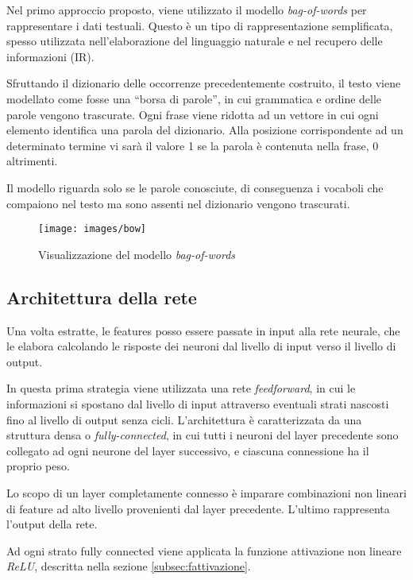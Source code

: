Nel primo approccio proposto, viene utilizzato il modello \emph{bag-of-words} per rappresentare i dati testuali.
Questo è un tipo di rappresentazione semplificata, spesso utilizzata nell'elaborazione del linguaggio naturale e nel recupero delle informazioni (IR). 

Sfruttando il dizionario delle occorrenze precedentemente costruito, il testo viene modellato  come fosse una ``borsa di parole'', in cui grammatica e ordine delle parole vengono trascurate.
Ogni frase viene ridotta ad un vettore in cui ogni elemento identifica una parola del dizionario. Alla posizione corrispondente ad un determinato termine vi sarà il valore \num{1} se la parola è contenuta nella frase, \num{0} altrimenti.

Il modello riguarda solo se le parole conosciute, di conseguenza i vocaboli che compaiono nel testo ma sono assenti nel dizionario vengono trascurati.

\begin{figure}[H]
	\centering
	{\texttt{[image: images/bow]}}
	\caption{Visualizzazione del modello \emph{bag-of-words}}
	\label{fig:bow}
\end{figure}


\subsection{Architettura della rete}
\label{subsec:modelli}

Una volta estratte, le features posso essere passate in input alla rete neurale, che le elabora calcolando le risposte dei neuroni dal livello di input verso il livello di output.

In questa prima strategia viene utilizzata una rete \emph{feedforward}, in cui le informazioni si spostano dal livello di input attraverso eventuali strati nascosti fino al livello di output senza cicli. L'architettura è caratterizzata da una struttura densa o \emph{fully-connected}, in cui tutti i neuroni del layer precedente sono collegato ad ogni neurone del layer successivo, e ciascuna connessione ha il proprio peso.


Lo scopo di un layer completamente connesso è imparare combinazioni non lineari di feature ad alto livello provenienti dal layer precedente. L’ultimo rappresenta l’output della rete.

Ad ogni strato fully connected viene applicata la funzione attivazione non lineare \emph{ReLU}, descritta nella sezione \ref{subsec:fattivazione}.

